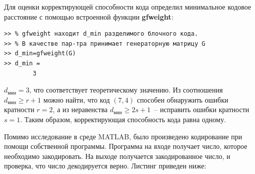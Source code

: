 \documentclass[12pt,a4paper]{article}
\begin{document}
  Для оценки корректирующей способности кода определил минимальное кодовое расстояние с помощью встроенной функции \textbf{gfweight}:
  \begin{lstlisting}
>> % gfweight находит d_min разделимого блочного кода.
>> % В качестве пар-тра принимает генераторную матрицу G
>> d_min=gfweight(G)
>> d_min =
        3
  \end{lstlisting}
  $d_\text{мин}=3$, что соответствует теоретическому значению. Из соотношения $d_\text{мин}\geq r+1$ можно найти, что код $(7,4)$ способен обнаружить ошибки кратности $r=2$, а из неравенства $d_\text{мин}\geq 2s+1$~-- исправить ошибки кратности $s=1$. Таким образом, корректирующая способность кода равна одному.

Помимо исследование в среде MATLAB, было произведено кодирование при помощи собственной программы.
Программа на входе получает число, которое необходимо закодировать. На выходе получается закодированное число, и проверка, что число декодируется верно.
Листинг приведен ниже:
\end{document}
